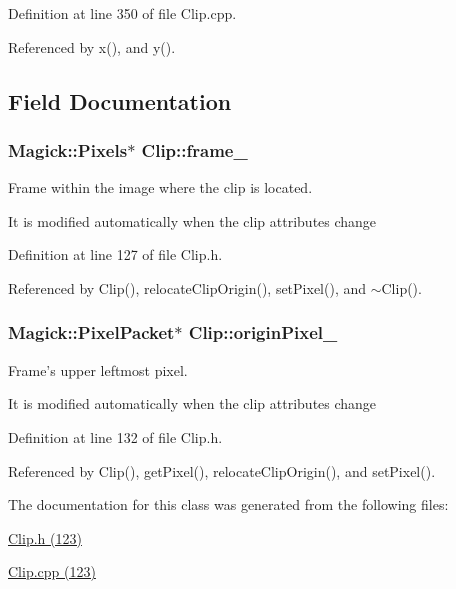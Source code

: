 Definition at line 350 of file Clip.cpp.

Referenced by x(), and y().

\subsection{Field Documentation}
\hypertarget{class_clip_2afdfb2cc29e6a97c70e55d5393e3a80}{
\subsubsection[frame\_\-]{\setlength{\rightskip}{0pt plus 5cm}Magick::Pixels$\ast$ {\bf Clip::frame\_\-}}}
\label{class_clip_2afdfb2cc29e6a97c70e55d5393e3a80}


Frame within the image where the clip is located. 

It is modified automatically when the clip attributes change 

Definition at line 127 of file Clip.h.

Referenced by Clip(), relocateClipOrigin(), setPixel(), and $\sim$Clip().\hypertarget{class_clip_593bf304450ff4c7fe4ded74dff1c188}{
\subsubsection[originPixel\_\-]{\setlength{\rightskip}{0pt plus 5cm}Magick::PixelPacket$\ast$ {\bf Clip::originPixel\_\-}}}
\label{class_clip_593bf304450ff4c7fe4ded74dff1c188}


Frame's upper leftmost pixel. 

It is modified automatically when the clip attributes change 

Definition at line 132 of file Clip.h.

Referenced by Clip(), getPixel(), relocateClipOrigin(), and setPixel().

The documentation for this class was generated from the following files:\begin{CompactItemize}
\item 
\hyperlink{_clip_8h}{Clip.h (123)}\item 
\hyperlink{_clip_8cpp}{Clip.cpp (123)}\end{CompactItemize}
